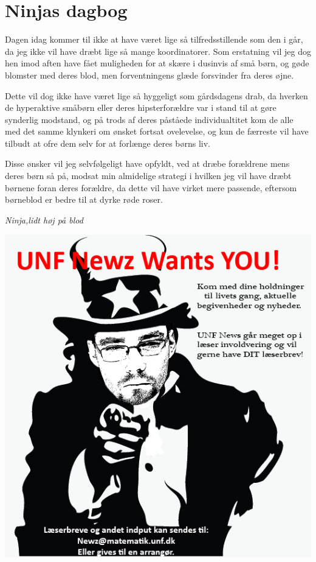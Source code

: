 \begin{minipage}[b]{0.95\linewidth}
\begin{minipage}[t]{0.47\textwidth}
\section*{Ninjas dagbog}
Dagen idag kommer til ikke at have været lige så tilfredsstillende som den i går, da jeg ikke vil have dræbt lige så mange koordinatorer. Som erstatning vil jeg dog hen imod aften have fået muligheden for at skære i dusinvis af små børn, og gøde blomster med deres blod, men forventningens glæde forsvinder fra deres øjne.

Dette vil dog ikke have været lige så hyggeligt som gårdsdagens drab, da hverken de hyperaktive småbørn eller deres hipsterforældre var i stand til at gøre synderlig modstand, og på trods af deres påståede individualtitet kom de alle med det samme klynkeri om ønsket fortsat ovelevelse, og kun de færreste vil have tilbudt at ofre dem selv for at forlænge deres børns liv. 

Disse ønsker vil jeg selvfølgeligt have opfyldt, ved at dræbe forældrene mens deres børn så på, modsat min almidelige strategi i hvilken jeg vil have dræbt børnene foran deres forældre, da dette vil have virket mere passende, eftersom børneblod er bedre til at dyrke røde roser.

{\flushright\emph{Ninja,lidt høj på blod}}

\vspace{2mm}
\includegraphics[width=\linewidth]{wewantyou.jpg}

\end{minipage}
\end{minipage}
